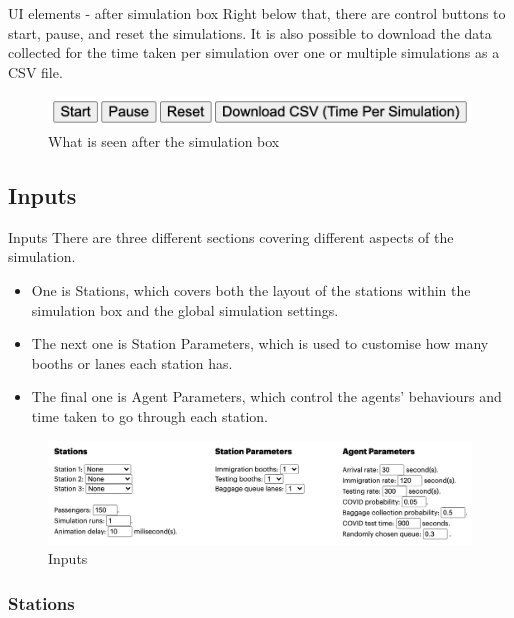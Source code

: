 \documentclass{beamer}
\begin{document}
\begin{frame}{UI elements - after simulation box}
	Right below that, there are control buttons to start, pause, and reset the simulations. It is also possible to download the data collected for the time taken per simulation over one or multiple simulations as a CSV file.
	\begin{figure}
		\includegraphics[scale=0.3]{../img/buttons}
		\caption{What is seen after the simulation box}
	\end{figure}
	
\end{frame}

\subsection{Inputs}

\begin{frame}{Inputs}
	There are three different sections covering different aspects of the simulation. 
	\begin{itemize}
		\item One is Stations, which covers both the layout of the stations within the simulation box and the global simulation settings. 
		\item The next one is Station Parameters, which is used to customise how many booths or lanes each station has. 
		\item The final one is Agent Parameters, which control the agents' behaviours and time taken to go through each station.
	\end{itemize}
	
	\begin{figure}
		\includegraphics[scale=0.3]{../img/inputs}
		\caption{Inputs}
	\end{figure}
	
\end{frame}

\subsubsection*{Stations}
\end{document}
